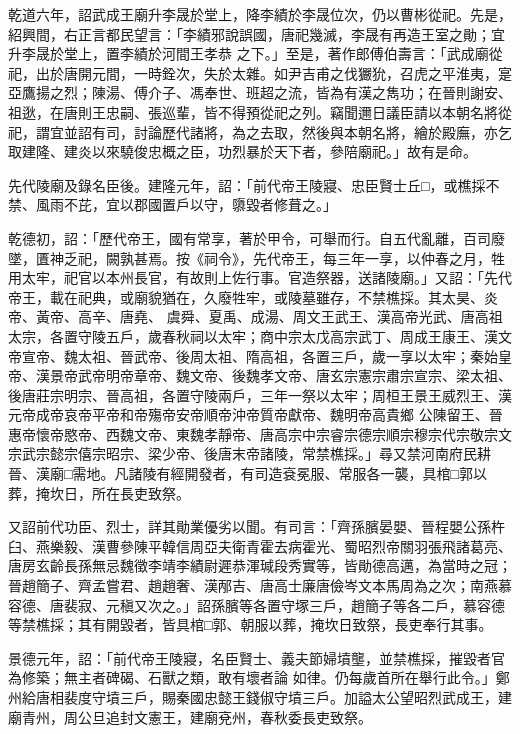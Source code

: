 \begin{pinyinscope}
 乾道六年，詔武成王廟升李晟於堂上，降李績於李晟位次，仍以曹彬從祀。先是，紹興間，右正言都民望言：「李績邪說誤國，唐祀幾滅，李晟有再造王室之勛；宜升李晟於堂上，置李績於河間王孝恭
 之下。」至是，著作郎傅伯壽言：「武成廟從祀，出於唐開元間，一時銓次，失於太雜。如尹吉甫之伐玁狁，召虎之平淮夷，寔亞鷹揚之烈；陳湯、傅介子、馮奉世、班超之流，皆為有漢之雋功；在晉則謝安、祖逖，在唐則王忠嗣、張巡輩，皆不得預從祀之列。竊聞邇日議臣請以本朝名將從祀，謂宜並詔有司，討論歷代諸將，為之去取，然後與本朝名將，繪於殿廡，亦乞取建隆、建炎以來驍俊忠概之臣，功烈暴於天下者，參陪廟祀。」故有是命。



 先代陵廟及錄名臣後。建隆元年，詔：「前代帝王陵寢、忠臣賢士丘□，或樵採不禁、風雨不芘，宜以郡國置戶以守，隳毀者修葺之。」



 乾德初，詔：「歷代帝王，國有常享，著於甲令，可舉而行。自五代亂離，百司廢墜，匱神乏祀，闕孰甚焉。按《祠令》，先代帝王，每三年一享，以仲春之月，牲用太牢，祀官以本州長官，有故則上佐行事。官造祭器，送諸陵廟。」又詔：「先代帝王，載在祀典，或廟貌猶在，久廢牲牢，或陵墓雖存，不禁樵採。其太昊、炎帝、黃帝、高辛、唐堯、
 虞舜、夏禹、成湯、周文王武王、漢高帝光武、唐高祖太宗，各置守陵五戶，歲春秋祠以太牢；商中宗太戊高宗武丁、周成王康王、漢文帝宣帝、魏太祖、晉武帝、後周太祖、隋高祖，各置三戶，歲一享以太牢；秦始皇帝、漢景帝武帝明帝章帝、魏文帝、後魏孝文帝、唐玄宗憲宗肅宗宣宗、梁太祖、後唐莊宗明宗、晉高祖，各置守陵兩戶，三年一祭以太牢；周桓王景王威烈王、漢元帝成帝哀帝平帝和帝殤帝安帝順帝沖帝質帝獻帝、魏明帝高貴鄉
 公陳留王、晉惠帝懷帝愍帝、西魏文帝、東魏孝靜帝、唐高宗中宗睿宗德宗順宗穆宗代宗敬宗文宗武宗懿宗僖宗昭宗、梁少帝、後唐末帝諸陵，常禁樵採。」尋又禁河南府民耕晉、漢廟□需地。凡諸陵有經開發者，有司造袞冕服、常服各一襲，具棺□郭以葬，掩坎日，所在長吏致祭。



 又詔前代功臣、烈士，詳其勛業優劣以聞。有司言：「齊孫臏晏嬰、晉程嬰公孫杵臼、燕樂毅、漢曹參陳平韓信周亞夫衛青霍去病霍光、蜀昭烈帝關羽張飛諸葛亮、
 唐房玄齡長孫無忌魏徵李靖李績尉遲恭渾瑊段秀實等，皆勛德高邁，為當時之冠；晉趙簡子、齊孟嘗君、趙趙奢、漢邴吉、唐高士廉唐儉岑文本馬周為之次；南燕慕容德、唐裴寂、元稹又次之。」詔孫臏等各置守塚三戶，趙簡子等各二戶，慕容德等禁樵採；其有開毀者，皆具棺□郭、朝服以葬，掩坎日致祭，長吏奉行其事。



 景德元年，詔：「前代帝王陵寢，名臣賢士、義夫節婦墳壟，並禁樵採，摧毀者官為修築；無主者碑碣、石獸之類，敢有壞者論
 如律。仍每歲首所在舉行此令。」鄭州給唐相裴度守墳三戶，賜秦國忠懿王錢俶守墳三戶。加謚太公望昭烈武成王，建廟青州，周公旦追封文憲王，建廟兗州，春秋委長吏致祭。




\end{pinyinscope}
